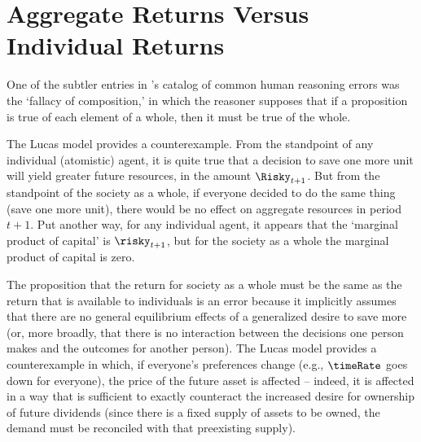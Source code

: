 \documentclass{handout}
\begin{document}
\begin{comment}%

Empirically, this is a bad assumption:  Using, e.g., quarterly data from the S\&P 500 stock index in the U.S.\, the
variation in total returns that reflects changes in dividends is only about [5?] percent.  Note further that 
the logarithmic utility model has an explicit prediction:  since $\Price_{t}/\dvdnd_{t} = \timeRate$, that model
says that the size of {\emph fluctuations} in prices is identical to the size of fluctuations in dividends: $\Delta \Price_{t+1}/\Price_{t} = \Delta \dvdnd_{t+1}/\dvdnd_{t}$.  Oops!

\end{comment}


\section{Aggregate Returns Versus Individual Returns}

One of the subtler entries in \cite{aristotleFallacies}'s catalog of common human reasoning errors was the `fallacy of composition,' in which the reasoner supposes that if a proposition is true of each element of a whole, then it must be true of the whole.

The Lucas model provides a counterexample.  From the standpoint of any individual (atomistic) agent, it is quite true that a decision to save one more unit will yield greater future resources, in the amount $\Risky_{t+1}$.  But from the standpoint of the society as a whole, if everyone decided to do the same thing (save one more unit), there would be no effect on aggregate resources in period $t+1$.  Put another way, for any individual agent, it appears that the `marginal product of capital' is $\risky_{t+1}$, but for the society as a whole the marginal product of capital is zero.

The proposition that the return for society as a whole must be the same as the return that is available to individuals is an error because it implicitly assumes that there are no general equilibrium effects of a generalized desire to save more (or, more broadly, that there is no interaction between the decisions one person makes and the outcomes for another person).  The Lucas model provides a counterexample in which, if everyone's preferences change (e.g., $\timeRate$ goes down for everyone), the price of the future asset is affected -- indeed, it is affected in a way that is sufficient to exactly counteract the increased desire for ownership of future dividends (since there is a fixed supply of assets to be owned, the demand must be reconciled with that preexisting supply).
\end{document}
